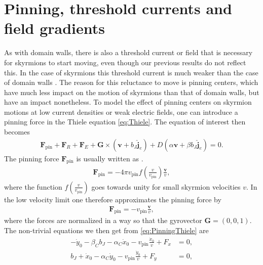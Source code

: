 \documentclass[12pt, a4paper, twoside, openright]{report}
\numberwithin{equation}{chapter}
\numberwithin{figure}{chapter}
\numberwithin{table}{chapter}
\begin{document}
\section{Pinning, threshold currents and field gradients}
As with domain walls, there is also a threshold current or field that is necessary for skyrmions to start moving, even though our previous results do not reflect this. In the case of skyrmions this threshold current is much weaker than the case of domain walls \cite{Jonietz2010}. The reason for this reluctance to move is pinning centers, which have much less impact on the motion of skyrmions than that of domain walls, but have an impact nonetheless. To model the effect of pinning centers on skyrmion motions at low current densities or weak electric fields, one can introduce a pinning force in the Thiele equation \eqref{eq:Thiele}. The equation of interest then becomes
\begin{align}
\label{eq:PinningThiele}
\mathbold{F}_{\textrm{pin}}+\mathbold{F}_R+\mathbold{F}_E + \mathbold{G} \times\left(\mathbold{v}+b_J\mathbold{\hat{j}}_e\right) + D\left(\alpha\mathbold{v}+\beta b_J \mathbold{\hat{j}}_e\right) = 0.
\end{align}
The pinning force $\mathbold{F}_{\textrm{pin}}$ is usually written as \cite{Everschor2012, Iwasaki2013}.
\begin{align}
\mathbold{F}_{\textrm{pin}} = -4\pi v_{\textrm{pin}} f(\frac{v}{v_{\textrm{pin}}}) \frac{\mathbold{v}}{v},
\end{align}
where the function $f(\frac{v}{v_{\textrm{pin}}})$ goes towards unity for small skyrmion velocities $v$. In the low velocity limit one therefore approximates the pinning force by
\begin{align}
\mathbold{F}_{\textrm{pin}} = - v_{\textrm{pin}} \frac{\mathbold{v}}{v},
\end{align}
where the forces are normalized in a way so that the gyrovector $\mathbold{G} = (0, 0, 1)$. The non-trivial equations we then get from \eqref{eq:PinningThiele} are
\begin{subequations}
\label{eq:PinningThieleComponents}
\begin{align}
\label{eq:PinningThieleA}
-\dot{y}_0 - \beta_Cb_J - \alpha_C\dot{x}_0 - v_{\textrm{pin}}\frac{\dot{x}_0}{v} + F_x &= 0, \\
\label{eq:PinningThieleB}
b_J + \dot{x}_0 - \alpha_C\dot{y}_0 - v_{\textrm{pin}}\frac{\dot{y}_0}{v} + F_y &= 0,
\end{align}
\end{subequations}
\end{document}
